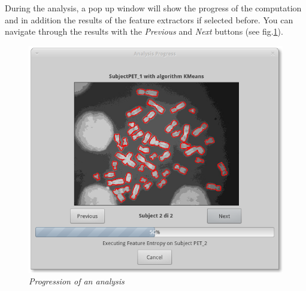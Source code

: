 During the analysis, a pop up window will show the progress of the computation and in addition the results of the feature extractors\g{} if selected before. You can navigate through the results with the \textit{Previous} and \textit{Next} buttons (see fig.\ref{analysisprogress}).
\begin{figure}[!h]
\begin{center}
\includegraphics[scale=0.4]{./Images/AnalysisProgress}
\caption{\textit{Progression of an analysis}}
\label{analysisprogress}
\end{center}
\end{figure}
\pagebreak